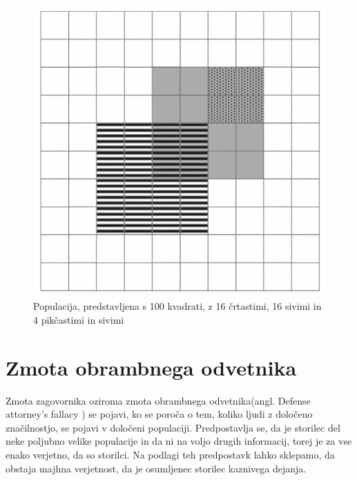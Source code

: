 \documentclass[12pt,a4paper]{amsart}
\theoremstyle{definition} %
\theoremstyle{plain} %
\begin{document}
\begin{figure}[!ht]\label{fig:slika2}
    \centering
    \includegraphics[scale=0.45]{slika2.png}
    \caption{Populacija, predstavljena s 100 kvadrati, z 16 črtastimi, 16 sivimi in 4 pikčastimi in sivimi}\vspace{2mm}
 \end{figure}
 
\section{Zmota obrambnega odvetnika}
Zmota zagovornika oziroma zmota obrambnega odvetnika(angl. Defense attorney's fallacy ) se pojavi, ko se poroča o tem, koliko ljudi z 
določeno značilnostjo, se pojavi v določeni populaciji. Predpostavlja se, da je storilec del neke poljubno velike populacije in da ni na voljo 
drugih informacij, torej je za vse enako verjetno, da so storilci. Na podlagi teh predpostavk lahko sklepamo, da obstaja majhna verjetnost, 
da je osumljenec storilec kaznivega dejanja. \\ 

\end{document}
